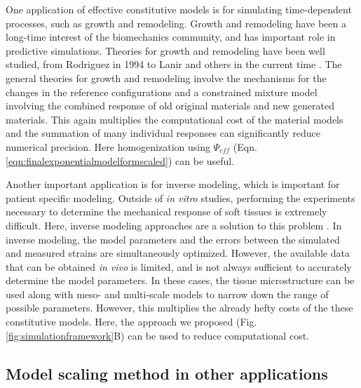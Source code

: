     One application of effective constitutive models is for simulating time-dependent processes, such as growth and remodeling. Growth and remodeling have been a long-time interest of the biomechanics community, and has important role in predictive simulations. Theories for growth and remodeling have been well studied, from Rodriguez in 1994 to Lanir and others in the current time \cite{lanir_mechanistic_2014, gleason_mixture_2004, rodriguez_stress_1994, humphrey_constrained_2002, cowin_tissue_2004, taber_biomechanics_1995}. The general theories for growth and remodeling involve the mechanisms for the changes in the reference configurations and a constrained mixture model involving the combined response of old original materials and new generated materials. This again multiplies the computational cost of the material models and the summation of many individual responses can significantly reduce numerical precision. Here homogenization using $\Psi_{eff}$ (Eqn. \ref{eqn:finalexponentialmodelformscaled}) can be useful. 
    

    Another important application is for inverse modeling, which is important for patient specific modeling. Outside of \textit{in vitro} studies, performing the experiments necessary to determine the mechanical response of soft tissues is extremely difficult. Here, inverse modeling approaches are a solution to this problem \cite{lee_inverse_2014, aggarwal_inverse_2015, aggarwal_patient_2013, kim_inverse_2009, liu_inverse_2013}. In inverse modeling, the model parameters and the errors between the simulated and measured strains are simultaneously optimized. However, the available data that can be obtained \textit{in vivo} is limited, and is not always sufficient to accurately determine the model parameters. In these cases, the tissue microstructure can be used along with meso- and multi-scale models to narrow down the range of possible parameters. However, this multiplies the already hefty costs of the these constitutive models. Here, the approach we proposed (Fig. \ref{fig:simulationframework}B) can be used to reduce computational cost.

 



\subsection{Model scaling method in other applications}
    
